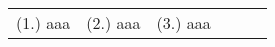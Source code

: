 \begin{eocexercises}{}
\par \practiceinfo
\par \begin{tabular}[h]{cccccc}

(1.)	aaa	&
(2.)	aaa	&
(3.)	aaa	&
\end{tabular}
\end{eocexercises} 




